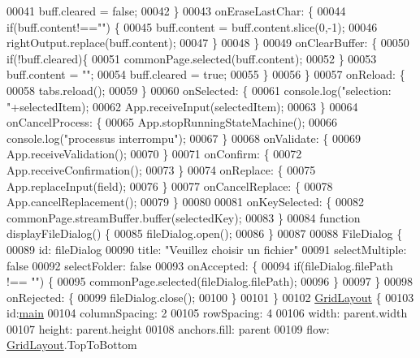 \begin{DoxyCode}
00041             buff.cleared = \textcolor{keyword}{false};
00042         \}
00043         onEraseLastChar: \{
00044             \textcolor{keywordflow}{if}(buff.content!==\textcolor{stringliteral}{""}) \{
00045                 buff.content = buff.content.slice(0,-1);
00046                 rightOutput.replace(buff.content);
00047             \}
00048         \}
00049         onClearBuffer: \{
00050             \textcolor{keywordflow}{if}(!buff.cleared)\{
00051                 commonPage.selected(buff.content);
00052             \}
00053             buff.content = \textcolor{stringliteral}{""};
00054             buff.cleared = \textcolor{keyword}{true};
00055         \}
00056     \}
00057     onReload: \{
00058         tabs.reload();
00059     \}
00060     onSelected: \{
00061         console.log(\textcolor{stringliteral}{"selection: "}+selectedItem);
00062         App.receiveInput(selectedItem);
00063     \}
00064     onCancelProcess: \{
00065         App.stopRunningStateMachine();
00066         console.log(\textcolor{stringliteral}{"processus interrompu"});
00067     \}
00068     onValidate: \{
00069         App.receiveValidation();
00070     \}
00071     onConfirm: \{
00072         App.receiveConfirmation();
00073     \}
00074     onReplace: \{
00075         App.replaceInput(field);
00076     \}
00077     onCancelReplace: \{
00078         App.cancelReplacement();
00079     \}
00080 
00081     onKeySelected: \{
00082         commonPage.streamBuffer.buffer(selectedKey);
00083     \}
00084     \textcolor{keyword}{function} displayFileDialog() \{
00085         fileDialog.open();
00086     \}
00087 
00088     FileDialog \{
00089         \textcolor{keywordtype}{id}: fileDialog
00090         title: \textcolor{stringliteral}{"Veuillez choisir un fichier"}
00091         selectMultiple: \textcolor{keyword}{false}
00092         selectFolder: \textcolor{keyword}{false}
00093         onAccepted: \{
00094             \textcolor{keywordflow}{if}(fileDialog.filePath !== \textcolor{stringliteral}{""}) \{
00095                 commonPage.selected(fileDialog.filePath);
00096             \}
00097         \}
00098         onRejected: \{
00099             fileDialog.close();
00100         \}
00101     \}
00102     \hyperlink{classGridLayout}{GridLayout} \{
00103         \textcolor{keywordtype}{id}:\hyperlink{main_8cpp_a3c04138a5bfe5d72780bb7e82a18e627}{main}
00104         columnSpacing: 2
00105         rowSpacing: 4
00106         width: parent.width
00107         height: parent.height
00108         anchors.fill: parent
00109         flow: \hyperlink{classGridLayout}{GridLayout}.TopToBottom

\end{DoxyCode}
